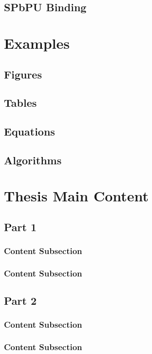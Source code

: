 \documentclass[oneside,14pt]{extarticle}
\begin{document}
		\subsection{SPbPU Binding} 
		\clearpage
	\section{Examples} 
		\subsection{Figures}  \clearpage
		\subsection{Tables}  \clearpage
		\subsection{Equations}  \clearpage
		\subsection{Algorithms}  \clearpage
	\section{Thesis Main Content} 
		\subsection{Part 1}
			\subsubsection{Content Subsection}
			\subsubsection{Content Subsection}
		\subsection{Part 2}
			\subsubsection{Content Subsection}
			\subsubsection{Content Subsection}
		\clearpage
\end{document}
